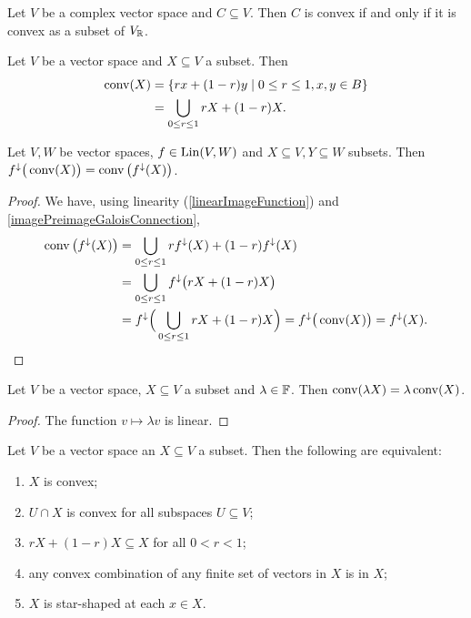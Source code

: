\begin{lemma} \label{convexityPropertyOfRealVectorSpaces}
Let $V$ be a complex vector space and $C\subseteq V$. Then $C$ is convex \textup{if and only if} it is convex as a subset of $V_{\mathbb{R}}$.
\end{lemma}

\begin{lemma} \label{convexHullLemma}
Let $V$ be a vector space and $X\subseteq V$ a subset. Then 
\begin{align*}
\convex(X) &= \setbuilder{rx + (1-r)y}{0\leq r \leq 1, x,y\in B} \\
&= \bigcup_{0\leq r\leq 1} rX + (1-r)X.
\end{align*}
\end{lemma}
\begin{corollary} \label{linearFunctionsPreserveConvexHull}
Let $V,W$ be vector spaces, $f\in \operatorname{Lin}(V,W)$ and $X\subseteq V, Y\subseteq W$ subsets. Then $f^\downarrow\big(\operatorname{conv}(X)\big) = \operatorname{conv}\big(f^\downarrow(X)\big)$.
\end{corollary}
\begin{proof}
We have, using linearity (\ref{linearImageFunction}) and \ref{imagePreimageGaloisConnection},
\begin{align*}
\operatorname{conv}\big(f^\downarrow(X)\big) &= \bigcup_{0\leq r\leq 1}rf^{\downarrow}(X) + (1-r)f^\downarrow(X) \\
&= \bigcup_{0\leq r\leq 1}f^{\downarrow}\big(rX + (1-r)X\big) \\
&= f^{\downarrow}\Big(\bigcup_{0\leq r\leq 1}rX + (1-r)X\Big) = f^{\downarrow}\big(\operatorname{conv}(X)\big) = f^{\downarrow}(X).
\end{align*}
\end{proof}
\begin{corollary} \label{convexHullHomogeneous}
Let $V$ be a vector space, $X\subseteq V$ a subset and $\lambda\in \mathbb{F}$. Then $\operatorname{conv}(\lambda X) = \lambda \operatorname{conv}(X)$.
\end{corollary}
\begin{proof}
The function $v\mapsto \lambda v$ is linear.
\end{proof}

\begin{lemma} \label{convexCriteria}
Let $V$ be a vector space an $X\subseteq V$ a subset. Then the following are equivalent:
\begin{enumerate}
\item $X$ is convex;
\item $U\cap X$ is convex for all subspaces $U\subseteq V$;
\item $rX + (1-r)X \subseteq X$ for all $0< r < 1$;
\item any convex combination of any finite set of vectors in $X$ is in $X$;
\item $X$ is star-shaped at each $x\in X$.
\end{enumerate}
\end{lemma}

